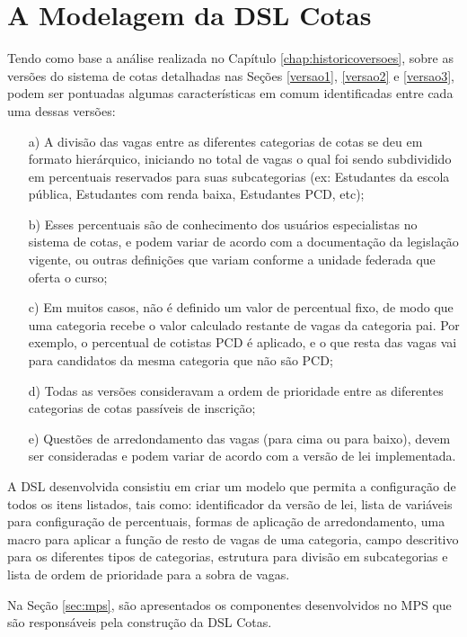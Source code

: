 \section{A Modelagem da DSL Cotas}
\label{sec:dslproposta:usuario}

   
 Tendo como base a análise realizada no Capítulo \ref{chap:historicoversoes}, sobre as versões do sistema de cotas detalhadas nas Seções \ref{versao1}, \ref{versao2} e \ref{versao3}, podem ser  pontuadas algumas características em comum identificadas entre cada uma dessas versões:
   
   \begin{enumerate}
    \item[a)] A divisão das vagas entre as diferentes categorias de cotas se deu em formato hierárquico, iniciando no total de vagas o qual foi sendo subdividido em percentuais reservados para suas subcategorias (ex: Estudantes da escola pública, Estudantes com renda baixa, Estudantes PCD, etc); 
   
   \item[b)] Esses percentuais são de conhecimento dos usuários especialistas no sistema de cotas, e podem variar de acordo com a documentação da legislação vigente, ou outras definições que variam conforme a unidade federada que oferta o curso; 
   
   \item[c)] Em muitos casos, não é definido um valor de percentual fixo, de modo que uma categoria recebe o valor calculado restante de vagas da categoria pai. Por exemplo, o percentual de cotistas \gls{PCD} é aplicado, e o que resta das vagas vai para candidatos da mesma categoria que não são \gls{PCD};

   \item[d)] Todas as versões consideravam a ordem de prioridade entre as diferentes categorias de cotas passíveis de inscrição;
   
   \item[e)] Questões de arredondamento das vagas (para cima ou para baixo), devem ser consideradas e podem variar de acordo com a versão de lei implementada.

   \end{enumerate}
   
   A \gls{DSL} desenvolvida consistiu em criar um modelo que permita a configuração de todos os itens listados, tais como: identificador da versão de lei, lista de variáveis para configuração de percentuais, formas de aplicação de arredondamento, uma macro para aplicar a função de resto de vagas de uma categoria, campo descritivo para os diferentes tipos de categorias, estrutura para divisão em subcategorias e lista de ordem de prioridade para a sobra de vagas.
   
   
    Na Seção \ref{sec:mps}, são apresentados os componentes desenvolvidos no MPS que são responsáveis pela construção da DSL Cotas.
    
   
